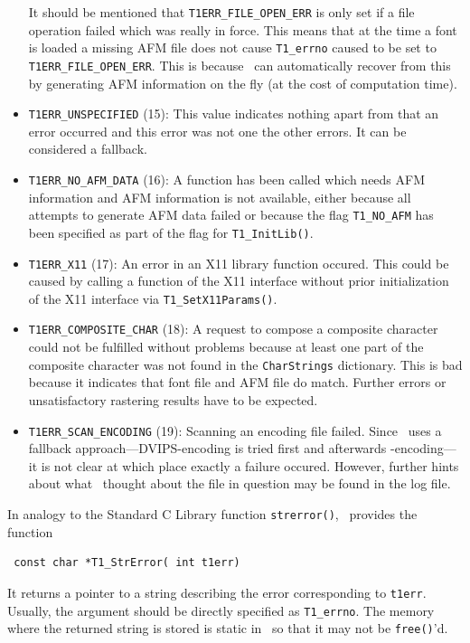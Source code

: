 \begin{itemize}
  It should be mentioned that \verb+T1ERR_FILE_OPEN_ERR+ is only set if a file
  operation failed which was really in force. This means that at the time a
  font is loaded a missing AFM file does not cause \verb+T1_errno+ caused to
  be set to \verb+T1ERR_FILE_OPEN_ERR+. This is because \tonelib\ can
  automatically recover from this by generating AFM information on the fly (at
  the cost of computation time).
\item \verb+T1ERR_UNSPECIFIED+ (15): This value indicates nothing apart from
  that an error occurred and this error was not one the other errors. It can
  be considered a fallback. 
\item \verb+T1ERR_NO_AFM_DATA+ (16): A function has been called which needs
  AFM information and AFM information is not available, either because all
  attempts to generate AFM data failed or because the flag \verb+T1_NO_AFM+
  has been specified as part of the flag for \verb+T1_InitLib()+. 
\item \verb+T1ERR_X11+ (17): An error in an X11 library function occured. This
  could be caused by calling a function of the X11 interface without prior
  initialization of the X11 interface via \verb+T1_SetX11Params()+.
\item \verb+T1ERR_COMPOSITE_CHAR+ (18): A request to compose a composite
  character could not be fulfilled without problems because at least one part
  of the composite character was not found in the \verb+CharStrings+
  dictionary. This is bad because it indicates that font file and AFM file do
  match. Further errors or unsatisfactory rastering results have to be
  expected. 
\item \verb+T1ERR_SCAN_ENCODING+ (19): Scanning an encoding file failed. Since
  \tonelib\ uses a fallback approach---DVIPS-encoding is tried first and
  afterwards \tonelib-encoding---it is not clear at which place exactly a
  failure occured. However, further hints about what \tonelib\ thought about
  the file in question may be found in the log file. 
\end{itemize}
In analogy to the Standard C Library function \verb+strerror()+, \tonelib\
provides the function
\precorr
\begin{verbatim}
 const char *T1_StrError( int t1err)
\end{verbatim}\postcorr
It returns a pointer to a string describing the error corresponding to
\verb+t1err+. Usually, the argument should be directly specified as
\verb+T1_errno+. The memory where the returned string is stored is static in
\tonelib\ so that it may not be \verb+free()+'d.


